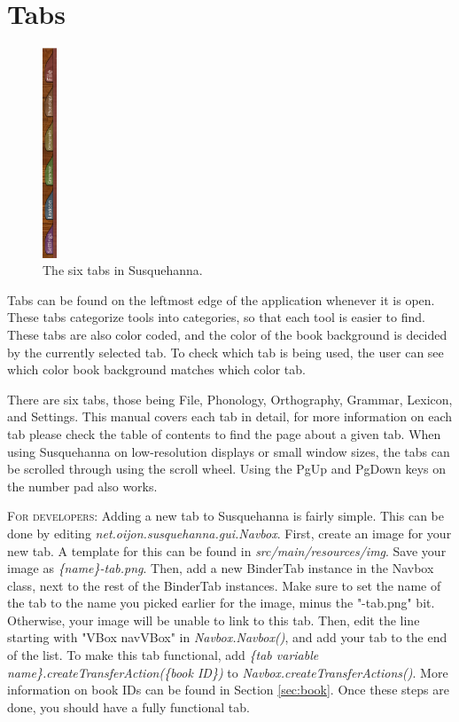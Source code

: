 \documentclass{report}
\begin{document}
	\section{Tabs}\label{sec:tabs}
	\begin{figure}
		\centering
		\includegraphics[width=0.038\textwidth]{img/tabs-screenshot}
		\caption{The six tabs in Susquehanna.}
		\label{fig:tabs-screenshot}
	\end{figure}
	Tabs can be found on the leftmost edge of the application whenever it is open. These tabs categorize tools into categories,	so that each tool is easier to find. These tabs are also color coded, and the color of the book background is decided by the currently selected tab. To check which tab is being used, the user can see which color book background matches which color tab.
	\par
	There are six tabs, those being File, Phonology, Orthography, Grammar, Lexicon, and Settings. This manual covers each tab in detail, for more information on each tab please check the table of contents to find the page about a given tab. When using Susquehanna on low-resolution displays or small window sizes, the tabs can be scrolled through using the scroll wheel. Using the PgUp and PgDown keys on the number pad also works. 
	\par
	\begin{tcolorbox}[width=1\textwidth]
	\textsc{For developers:} Adding a new tab to Susquehanna is fairly simple. This can be done by editing \emph{net.oijon.susquehanna.gui.Navbox}. First, create an image for your new tab. A template for this can be found in \emph{src/main/resources/img}. Save your image as \emph{\{name\}-tab.png}. Then, add a new BinderTab instance in the Navbox class, next to the rest of the BinderTab instances. Make sure to set the name of the tab to the name you picked earlier for the image, minus the "-tab.png" bit. Otherwise, your image will be unable to link to this tab. Then, edit the line starting with "VBox navVBox" in \emph{Navbox.Navbox()}, and add your tab to the end of the list. To make this tab functional, add \emph{\{tab variable name\}.createTransferAction(\{book ID\})} to \emph{Navbox.createTransferActions()}. More information on book IDs can be found in Section \ref{sec:book}. Once these steps are done, you should have a fully functional tab.
	\end{tcolorbox}
\end{document}
